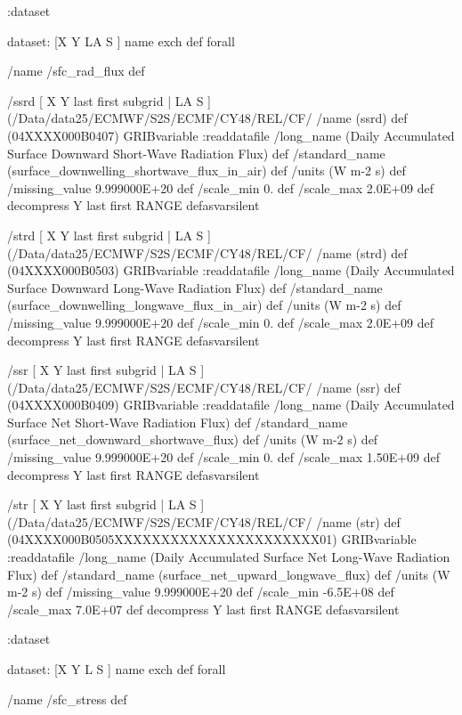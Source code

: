 \begin{ingrid}
:dataset

dataset:
[X Y LA S ] {name exch def } forall

/name /sfc_rad_flux def

/ssrd { [ X Y last first subgrid | LA S ] (/Data/data25/ECMWF/S2S/ECMF/CY48/REL/CF/%
/name (ssrd) def
(04XXXX000B0407) GRIBvariable
:readdatafile
/long_name (Daily Accumulated Surface Downward Short-Wave Radiation Flux) def
/standard_name (surface_downwelling_shortwave_flux_in_air) def
/units (W m-2 s) def
/missing_value 9.999000E+20 def
/scale_min 0. def
/scale_max 2.0E+09 def
decompress
Y last first RANGE
} defasvarsilent

/strd { [ X Y last first subgrid | LA S ] (/Data/data25/ECMWF/S2S/ECMF/CY48/REL/CF/%
/name (strd) def
(04XXXX000B0503) GRIBvariable
:readdatafile
/long_name (Daily Accumulated Surface Downward Long-Wave Radiation Flux) def
/standard_name (surface_downwelling_longwave_flux_in_air) def
/units (W m-2 s) def
/missing_value 9.999000E+20 def
/scale_min 0. def
/scale_max 2.0E+09 def
decompress
Y last first RANGE
} defasvarsilent

/ssr { [ X Y last first subgrid | LA S ] (/Data/data25/ECMWF/S2S/ECMF/CY48/REL/CF/%
/name (ssr) def
(04XXXX000B0409) GRIBvariable
:readdatafile
/long_name (Daily Accumulated Surface Net Short-Wave Radiation Flux) def
/standard_name (surface_net_downward_shortwave_flux) def
/units (W m-2 s) def
/missing_value 9.999000E+20 def
/scale_min 0. def
/scale_max 1.50E+09 def
decompress
Y last first RANGE
} defasvarsilent

/str { [ X Y last first subgrid | LA S ] (/Data/data25/ECMWF/S2S/ECMF/CY48/REL/CF/%
/name (str) def
(04XXXX000B0505XXXXXXXXXXXXXXXXXXXXXX01) GRIBvariable
:readdatafile
/long_name (Daily Accumulated Surface Net Long-Wave Radiation Flux) def
/standard_name (surface_net_upward_longwave_flux) def
/units (W m-2 s) def
/missing_value 9.999000E+20 def
/scale_min -6.5E+08 def
/scale_max 7.0E+07 def
decompress
Y last first RANGE
} defasvarsilent

:dataset

dataset:
[X Y L S ] {name exch def } forall

/name /sfc_stress def


\end{ingrid}
